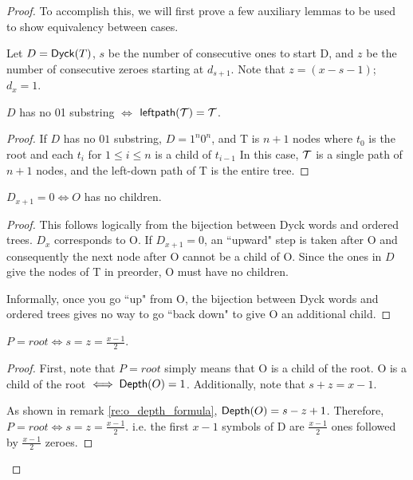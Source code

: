\begin{proof}
To accomplish this, we will first prove a few auxiliary lemmas to be used to show equivalency between cases. 

Let $D=\mathsf{Dyck}{(T)}$, $s$ be the number of consecutive ones to start D, and $z$ be the number of consecutive zeroes starting at $d_{s+1}$.  Note that $z=(x-s-1)$; $d_{x}=1$.
\begin{lemma} \label{le:final_case_equivalence}

    $D$ has no 01 substring $\iff$ $\mathsf{leftpath}{(\mathcal{\mathcal{T}})}=\mathcal{T}$.
\end{lemma}
\begin{proof}


    If $D$ has no $01$ substring, $D=1^n0^n$, and T is $n+1$ nodes where $t_0$ is the root and each $t_i$ for $1\le i \le n$ is a child of $t_{i-1}$  In this case, $\mathcal{T}$ is a single path of $n+1$ nodes, and the left-down path of T is the entire tree.
\end{proof}
\begin{lemma} \label{le:no_children_equivalence}
    $D_{x+1} = 0 \iff O$ has no children.
\end{lemma}
\begin{proof}

    This follows logically from the bijection between Dyck words and ordered trees.  $D_x$ corresponds to O.  If $D_{x+1}=0$, an ``upward" step is taken after O and consequently the next node after O cannot be a child of O.  Since the ones in $D$ give the nodes of T in preorder, O must have no children.

    Informally, once you go ``up" from O, the bijection between Dyck words and ordered trees gives no way to go ``back down" to give O an additional child.
\end{proof}
\begin{lemma} \label{le:tight_case_equivalence}
    $P=root \iff s=z=\frac{x-1}{2}$.
\end{lemma}
\begin{proof}

    First, note that $P=root$ simply means that O is a child of the root.  O is a child of the root $\iff \mathsf{Depth}{(O)}=1$.  Additionally, note that $s+z=x-1$.

    As shown in remark \ref{re:o_depth_formula}, $\mathsf{Depth}{(O)}=s-z+1$. Therefore, $P=root \iff s=z=\frac{x-1}{2}$.
    i.e. the first $x-1$ symbols of D are $\frac{x-1}{2}$ ones followed by $\frac{x-1}{2}$ zeroes. 



\end{proof}
\end{proof}
